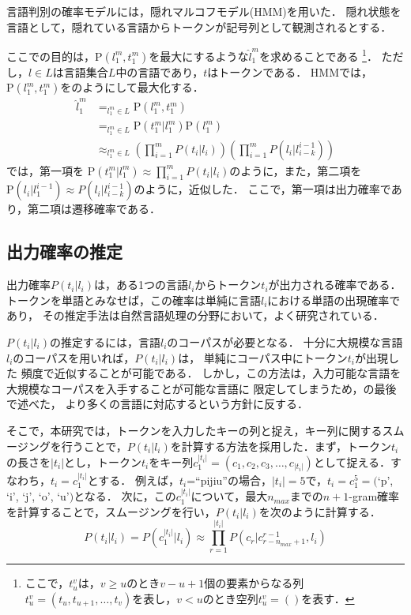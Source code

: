 \documentclass[japanese]{jnlp_1.4}
\newcommand{\secref}[1]{}
\renewcommand{\eqref}[1]{}
\newcommand{\argmax}{}
\begin{document}
言語判別の確率モデルには，隠れマルコフモデル(HMM)を用いた．
隠れ状態を言語として，隠れている言語からトークンが記号列として観測されるとする． 

ここでの目的は，$\mathrm{P}(l_1^{m}, t_1^{m})$を最大にするような$\hat{l}_1^m$を求めることである
\footnote{ここで，$t_u^v$は，$v \geq u$のとき$v-u+1$個の要素からなる列$t_u^v=(t_u, t_{u+1},\dots,t_v)$を表し，$v < u$のとき空列$t^v_u=()$を表す．}．
ただし，$l \in L$は言語集合$L$中の言語であり，$t$はトークンである．
    HMMでは，$\mathrm{P}(l_1^m, t_1^m)$を\eqref{eq:approx}のようにして最大化する．
\begin{align} 
  \hat{l}_1^m &= \argmax_{l_1^m \in L} \mathrm{P}(l_1^{m}, t_1^m) \nonumber 
\\
  &= \argmax_{l_1^m \in L} \mathrm{P}(t_1^m | l_1^m)\mathrm{P}(l_1^m) \nonumber \\
  & \approx \argmax_{l_1^m \in L} \left(\prod_{i=1}^m P(t_i|l_i) \right) 
  \left(\prod_{i=1}^m P(l_i|l_{i-k}^{i-1}) \right) 
  \label{eq:approx} 
\end{align}
\eqref{eq:approx}では，第一項を
$\mathrm{P}(t_1^m|l_1^m) \approx \prod_{i=1}^m P(t_i|l_i)$のように，また，第二項を
$\mathrm{P}(l_i|l_1^{i-1}) \approx P(l_i|l_{i-k}^{i-1})$のように，近似した．
ここで，第一項は出力確率であり，第二項は遷移確率である．



\subsection{出力確率の推定} 
\label{sec:output}

出力確率$P(t_i|l_i)$は，ある1つの言語$l_i$からトークン$t_i$が出力される確率である．
トークンを単語とみなせば，この確率は単純に言語$l_i$における単語の出現確率であり，
その推定手法は自然言語処理の分野において，よく研究されている．

$P(t_i|l_i)$の推定するには，言語$l_i$のコーパスが必要となる．
十分に大規模な言語$l_i$のコーパスを用いれば，$P(t_i|l_i)$は，
単純にコーパス中にトークン$t_i$が出現した
頻度で近似することが可能である．
しかし，この方法は，入力可能な言語を大規模なコーパスを入手することが可能な言語に
限定してしまうため，\secref{sec:design}の最後で述べた，
より多くの言語に対応するという方針に反する．


そこで，本研究では，トークンを入力したキーの列と捉え，キー列に関するスムージングを行うことで，$P(t_i|l_i)$を計算する方法を採用した．まず，トークン$t_i$の長さを$|t_i|$とし，トークン$t_i$をキー列$c_1^{|t_i|}=(c_1, c_2, c_3, \dots, c_{|t_i|}) $として捉える．すなわち，$t_i=c_1^{|t_i|}$とする．
例えば，$t_i$=``pijiu''の場合，$|t_i|=5$で，$t_i=c_1^5=($`p', `i', `j', `o', `u'$)$となる．
次に，この$c_1^{|t_i|}$について，最大$n_{max}$までの$n+1$-gram確率を計算することで，スムージングを行い，$P(t_i|l_i)$を次のように計算する．
\begin{equation} 
  P(t_i|l_i)=P(c_1^{|t_i|} | l_i) \approx \prod_{r=1}^{|t_i|} P(c_r|c_{r-n_{max}+1}^{r-1}, l_i) 
  \label{eq:decompose} 
\end{equation} 
\end{document}

